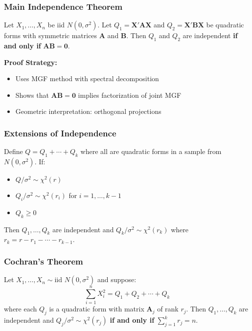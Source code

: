 \subsubsection{Main Independence Theorem}

\begin{theorem}
Let $X_1, \ldots, X_n$ be iid $N(0, \sigma^2)$. Let $Q_1 = \mathbf{X}'\mathbf{A}\mathbf{X}$ and $Q_2 = \mathbf{X}'\mathbf{B}\mathbf{X}$ be quadratic forms with symmetric matrices $\mathbf{A}$ and $\mathbf{B}$.
Then $Q_1$ and $Q_2$ are independent \textbf{if and only if} $\mathbf{AB} = \mathbf{0}$.
\end{theorem}
\textbf{Proof Strategy:}

\begin{itemize}
	\item Uses MGF method with spectral decomposition
	\item Shows that $\mathbf{AB} = \mathbf{0}$ implies factorization of joint MGF
	\item Geometric interpretation: orthogonal projections
\end{itemize}

\subsubsection{Extensions of Independence}

\begin{theorem}
Define $Q = Q_1 + \cdots + Q_k$ where all are quadratic forms in a sample from $N(0, \sigma^2)$.
If:
	\begin{itemize}
		\item $Q/\sigma^2 \sim \chi^2(r)$
		\item $Q_i/\sigma^2 \sim \chi^2(r_i)$ for $i = 1, \ldots, k-1$
		\item $Q_k \geq 0$
	\end{itemize}
Then $Q_1, \ldots, Q_k$ are independent and $Q_k/\sigma^2 \sim \chi^2(r_k)$ where $r_k = r - r_1 - \cdots - r_{k-1}$.
\end{theorem}
\subsubsection{Cochran's Theorem}

\begin{theorem}
Let $X_1, \ldots, X_n \sim \text{iid } N(0, \sigma^2)$ and suppose:
\[
\sum_{i=1}^n X_i^2 = Q_1 + Q_2 + \cdots + Q_k
\]
where each $Q_j$ is a quadratic form with matrix $\mathbf{A}_j$ of rank $r_j$.
Then $Q_1, \ldots, Q_k$ are independent and $Q_j/\sigma^2 \sim \chi^2(r_j)$ \textbf{if and only if} $\sum_{j=1}^k r_j = n$.
\end{theorem}
